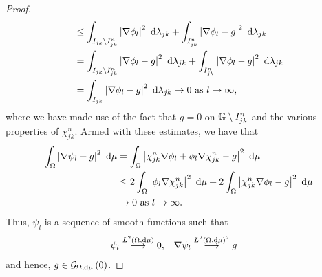 \begin{proof}
\begin{align*}
		&\leq \int_{I_{jk}\setminus I_{jk}^n}\left\lvert \nabla\phi_l \right\rvert^2 \ \mathrm{d}\lambda_{jk} +  \int_{I_{jk}^n}\left\lvert \nabla\phi_l - g \right\rvert^2 \ \mathrm{d}\lambda_{jk} \\
		&= \int_{I_{jk}\setminus I_{jk}^n}\left\lvert \nabla\phi_l - g \right\rvert^2 \ \mathrm{d}\lambda_{jk} +  \int_{I_{jk}^n}\left\lvert \nabla\phi_l - g \right\rvert^2 \ \mathrm{d}\lambda_{jk} \\
		&= \int_{I_{jk}}\left\lvert \nabla\phi_l - g \right\rvert^2 \ \mathrm{d}\lambda_{jk} \rightarrow0 \ \text{as} \ l \rightarrow\infty,
	\end{align*}
	where we have made use of the fact that $g=0$ on $\mathbb{G}\setminus I_{jk}^n$ and the various properties of $\chi_{jk}^n$.
	Armed with these estimates, we have that
	\begin{align*}
		\int_{\Omega}\left\lvert \nabla\psi_l - g \right\rvert^2 \ \mathrm{d}\mu 
		&= \int_{\Omega}\left\lvert \chi_{jk}^n\nabla\phi_l + \phi_l\nabla\chi_{jk}^n - g \right\rvert^2 \ \mathrm{d}\mu \\
		&\leq 2\int_{\Omega}\left\lvert \phi_l\nabla\chi_{jk}^n \right\rvert^2 \ \mathrm{d}\mu + 2\int_{\Omega}\left\lvert \chi_{jk}^n\nabla\phi_l - g \right\rvert^2 \ \mathrm{d}\mu \\
		&\rightarrow0 \ \text{as} \ l \rightarrow\infty.
	\end{align*}
	Thus, $\psi_l$ is a sequence of smooth functions such that
	\begin{align*}
		\psi_l \overset{L^{2}\left( \Omega,\mathrm{d}\mu \right)}{\longrightarrow} 0, &\quad
		\nabla\psi_l \overset{L^{2}\left( \Omega,\mathrm{d}\mu \right)^2}{\longrightarrow} g
	\end{align*}
	and hence, $g\in\mathcal{G}_{ \Omega, \mathrm{d}\mu}\left( 0 \right)$.
\end{proof}

